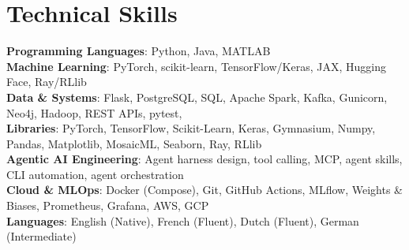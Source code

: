 \documentclass[letterpaper,11pt]{article}
\begin{document}
\vspace{-17pt}

%
\section{Technical Skills}
 \begin{itemize}[leftmargin=0.15in, label={}]
    \small{\item{
        
     \textbf{Programming Languages}{: Python, Java, MATLAB} \\
     \textbf{Machine Learning}: PyTorch, scikit-learn, TensorFlow/Keras, JAX, Hugging Face, Ray/RLlib \\
     \textbf{Data \& Systems}: Flask, PostgreSQL, SQL, Apache Spark, Kafka, Gunicorn, Neo4j, Hadoop, REST APIs, pytest, \\
     \textbf{Libraries}{: PyTorch, TensorFlow, Scikit-Learn, Keras, Gymnasium, Numpy, Pandas, Matplotlib, MosaicML, Seaborn, Ray, RLlib}\\
     \textbf{Agentic AI Engineering}: Agent harness design, tool calling, MCP, agent skills, CLI automation, agent orchestration \\
     \textbf{Cloud \& MLOps}: Docker (Compose), Git, GitHub Actions, MLflow, Weights \& Biases, Prometheus, Grafana, AWS, GCP \\
     \textbf{Languages}{: English (Native), French (Fluent), Dutch (Fluent), German (Intermediate)}}}
 \end{itemize}
  
\end{document}
